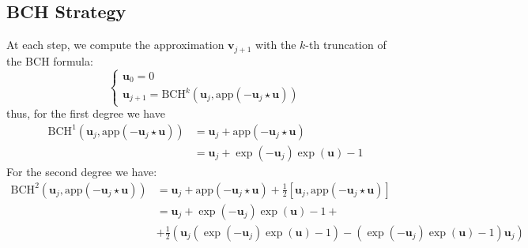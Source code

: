 \subsection{BCH Strategy}
At each step, we compute the approximation $\mathbf{v}_{j+1}$ with the $k$-th truncation of the BCH formula:
\begin{equation}\label{eq:bossa_strat}
\begin{cases}
\mathbf{u}_0 = 0 \\
\mathbf{u}_{j+1} = \text{BCH}^{k}(\mathbf{u}_{j}, \text{app}(-\mathbf{u}_{j}  \star  \mathbf{u} ))
\end{cases}
\end{equation}
thus, for the first degree we have 
\begin{align*}
	\text{BCH}^{1}(\mathbf{u}_{j}, \text{app}(-\mathbf{u}_{j}  \star  \mathbf{u} ))
	&=
	\mathbf{u}_{j} +  \text{app}(-\mathbf{u}_{j}  \star  \mathbf{u} )\\
	&=
	\mathbf{u}_{j} + \exp(-\mathbf{u}_{j}) \exp( \mathbf{u})  - 1
\end{align*}
For the second degree we have:
\begin{align*}
\text{BCH}^{2}(\mathbf{u}_{j}, \text{app}(-\mathbf{u}_{j}  \star  \mathbf{u} ))
&=
\mathbf{u}_{j} +  \text{app}(-\mathbf{u}_{j}  \star  \mathbf{u} ) + \frac{1}{2}[\mathbf{u}_{j},  \text{app}(-\mathbf{u}_{j}  \star  \mathbf{u} )]\\
&=
\mathbf{u}_{j} + \exp(-\mathbf{u}_{j}) \exp( \mathbf{u})  - 1 + \\
&+ \frac{1}{2}(  \mathbf{u}_{j}( \exp(-\mathbf{u}_{j}) \exp( \mathbf{u})  - 1) -  ( \exp(-\mathbf{u}_{j}) \exp( \mathbf{u})  - 1)\mathbf{u}_{j})
\end{align*}


